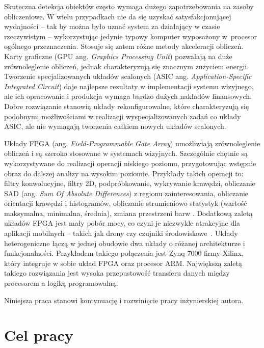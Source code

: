 Skuteczna detekcja obiektów często wymaga dużego zapotrzebowania na zasoby obliczeniowe. 
W wielu przypadkach nie da się uzyskać satysfakcjonującej wydajności -- tak by można było uznać system za działający w czasie rzeczywistym -- wykorzystując jedynie typowy komputer wyposażony w~procesor ogólnego przeznaczenia. 
Stosuje się zatem różne metody akceleracji obliczeń. 
Karty graficzne (GPU ang. \textit{Graphics Processing Unit}) pozwalają na duże zrównoleglenie obliczeń, jednak charakteryzują się znacznym zużyciem energii. %
Tworzenie specjalizowanych układów scalonych (ASIC ang. \textit{Application-Specific Integrated Circuit}) daje najlepsze rezultaty w implementacji systemu wizyjnego, ale ich opracowanie i produkcja wymaga bardzo dużych nakładów finansowych. %
Dobre rozwiązanie stanowią układy rekonfigurowalne, które charakteryzują się podobnymi możliwościami w realizacji wyspecjalizowanych zadań co układy ASIC, ale nie wymagają tworzenia całkiem nowych układów scalonych. %

Układy FPGA (ang. \textit{Field-Programmable Gate Array}) umożliwiają zrównoleglenie obliczeń i są szeroko stosowane w systemach wizyjnych. 
Szczególnie chętnie są wykorzystywane do realizacji operacji niskiego poziomu, przygotowując wstępnie obraz do dalszej analizy na wysokim poziomie. 
Przykłady takich operacji to: filtry konwolucyjne, filtry 2D, podpróbkowanie, wykrywanie krawędzi, obliczanie SAD (ang. \textit{Sum Of Absolute Differences}) z regionu zainteresowania, obliczanie orientacji krawędzi i histogramów, obliczanie strumieniowo statystyk (wartość maksymalna, minimalna, średnia), zmiana przestrzeni barw \cite{kisacanin2008embedded}. %
Dodatkową zaletą układów FPGA jest mały pobór mocy, co czyni je niezwykle atrakcyjne dla aplikacji mobilnych -- takich jak drony czy czujniki środowiskowe~\cite{garcia2014survey}. 
Układy heterogeniczne łączą w jednej obudowie dwa układy o różanej architekturze i funkcjonalności. 
Przykładem takiego połączenia jest Zynq-7000 firmy Xilinx, który integruje w sobie układ FPGA oraz procesor ARM. 
Największą zaletą takiego rozwiązania jest wysoka przepustowość transferu danych między procesorem a logiką programowalną. 

Niniejsza praca stanowi kontynuację i rozwinięcie pracy inżynierskiej autora.

\section{Cel pracy}

